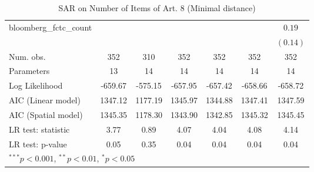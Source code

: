 \begin{table}[!h]
\begin{center}
\begin{tabular}{l c c c c c c }
bloomberg\_fctc\_count  &              &              &              &              &              & $0.19$       \\
                        &              &              &              &              &              & $(0.14)$     \\
\midrule
Num. obs.               & 352          & 310          & 352          & 352          & 352          & 352          \\
Parameters              & 13           & 14           & 14           & 14           & 14           & 14           \\
Log Likelihood          & -659.67      & -575.15      & -657.95      & -657.42      & -658.66      & -658.72      \\
AIC (Linear model)      & 1347.12      & 1177.19      & 1345.97      & 1344.88      & 1347.41      & 1347.59      \\
AIC (Spatial model)     & 1345.35      & 1178.30      & 1343.90      & 1342.85      & 1345.32      & 1345.45      \\
LR test: statistic      & 3.77         & 0.89         & 4.07         & 4.04         & 4.08         & 4.14         \\
LR test: p-value        & 0.05         & 0.35         & 0.04         & 0.04         & 0.04         & 0.04         \\
\bottomrule
\multicolumn{7}{l}{\scriptsize{$^{***}p<0.001$, $^{**}p<0.01$, $^*p<0.05$}}
\end{tabular}
\caption{SAR on Number of Items of Art. 8 (Minimal distance)}
\label{table:coefficients}
\end{center}
\end{table}
